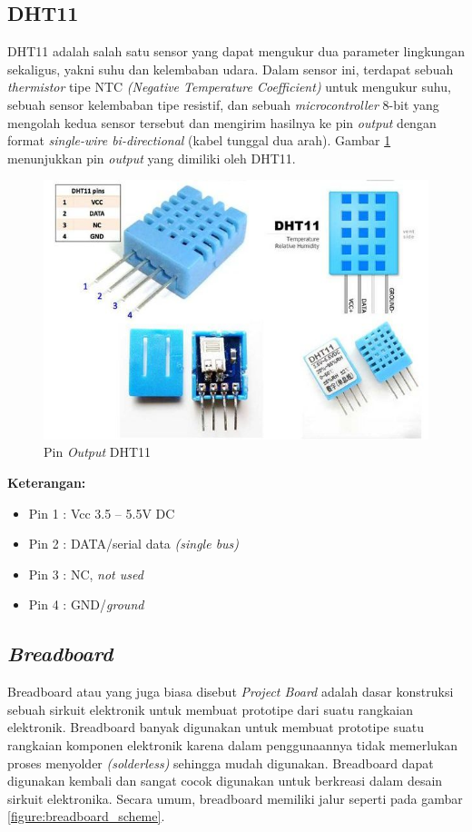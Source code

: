 \subsection{DHT11}
\tab DHT11 adalah salah satu sensor yang dapat mengukur dua parameter lingkungan sekaligus, yakni suhu dan kelembaban udara. Dalam sensor ini, terdapat sebuah \textit{thermistor} tipe NTC \textit{(Negative Temperature Coefficient)} untuk mengukur suhu, sebuah sensor kelembaban tipe resistif, dan sebuah \textit{microcontroller} 8-bit yang mengolah kedua sensor tersebut dan mengirim hasilnya ke pin \textit{output} dengan format \textit{single-wire bi-directional} (kabel tunggal dua arah). Gambar \ref{figure:pinout-DHT11} menunjukkan pin \textit{output} yang dimiliki oleh DHT11.

\begin{figure}[H]
	\centerline {
		\includegraphics[width=\linewidth]{bab3/img/pinout-DHT11.jpg}
	}
	\caption{Pin \textit{Output} DHT11}
	\label{figure:pinout-DHT11}
\end{figure}

\textbf{Keterangan:}
\begin{itemize}
	\item Pin 1 : Vcc 3.5 – 5.5V DC
	\item Pin 2 : DATA/serial data \textit{(single bus)}
	\item Pin 3 : NC, \textit{not used}
	\item Pin 4 : GND/\textit{ground}
\end{itemize}


\subsection{\textit{Breadboard}}
\tab Breadboard atau yang juga biasa disebut \textit{Project Board} adalah dasar konstruksi sebuah sirkuit elektronik untuk membuat prototipe dari suatu rangkaian elektronik. Breadboard banyak digunakan untuk membuat prototipe suatu rangkaian komponen elektronik karena dalam penggunaannya tidak memerlukan proses menyolder \textit{(solderless)} sehingga mudah digunakan. Breadboard dapat digunakan kembali dan sangat cocok digunakan untuk berkreasi dalam desain sirkuit elektronika. Secara umum, breadboard memiliki jalur seperti pada gambar \ref{figure:breadboard_scheme}.

